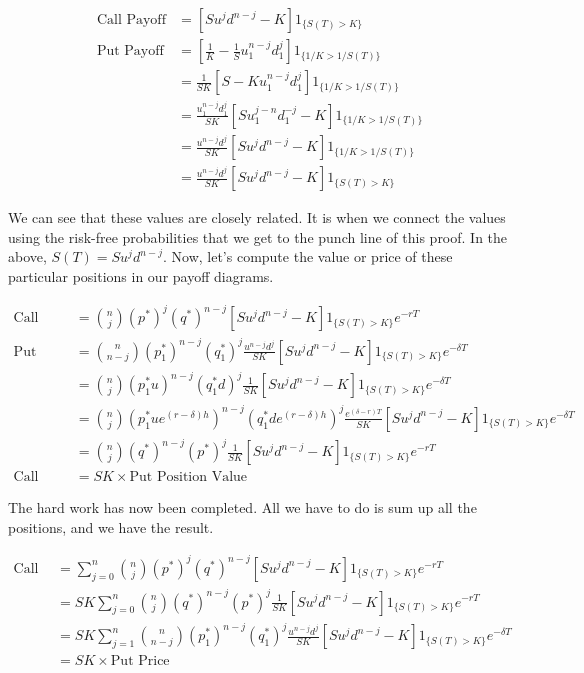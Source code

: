 \documentclass{ximera}
\begin{document}
\begin{align*}
\text{Call Payoff} 	&=[Su^jd^{n-j}-K]1_{\{S(T)>K\}}\\
\text{Put Payoff} 	&=\left[\frac{1}{K}-\frac{1}{S}u_1^{n-j}d_1^j\right]1_{\{1/K>1/S(T)\}}\\
			&=\frac{1}{SK}[S-Ku_1^{n-j}d_1^j]1_{\{1/K>1/S(T)\}}\\
			&=\frac{u_1^{n-j}d_1^j}{SK}[Su_1^{j-n}d_1^{-j}-K]1_{\{1/K>1/S(T)\}}\\
			&=\frac{u^{n-j}d^j}{SK}[Su^jd^{n-j}-K]1_{\{1/K>1/S(T)\}}\\
			&=\frac{u^{n-j}d^j}{SK}[Su^jd^{n-j}-K]1_{\{S(T)>K\}}
\end{align*}

We can see that these values are closely related. It is when we connect the values using the risk-free probabilities that we get to the punch line of this proof. In the above, $S(T)=Su^jd^{n-j}$. Now, let's compute the value or price of these particular positions in our payoff diagrams. 

\begin{align*}
\text{Call Position Value} 	&=\binom{n}{j}(p^*)^j(q^*)^{n-j}[Su^jd^{n-j}-K]1_{\{S(T)>K\}}e^{-rT}\\
\text{Put Position Value} 	&=\binom{n}{n-j}(p_1^*)^{n-j}(q_1^*)^{j}\frac{u^{n-j}d^j}{SK}[Su^jd^{n-j}-K]1_{\{S(T)>K\}}e^{-\delta T}\\
				&=\binom{n}{j}(p_1^*u)^{n-j}(q_1^*d)^{j}\frac{1}{SK}[Su^jd^{n-j}-K]1_{\{S(T)>K\}}e^{-\delta T}\\
				&=\binom{n}{j}(p_1^*ue^{(r-\delta)h})^{n-j}(q_1^*de^{(r-\delta)h})^j\frac{e^{(\delta-r)T}}{SK}[Su^jd^{n-j}-K]1_{\{S(T)>K\}}e^{-\delta T}\\
				&=\binom{n}{j}(q^*)^{n-j}(p^*)^j\frac{1}{SK}[Su^jd^{n-j}-K]1_{\{S(T)>K\}}e^{-rT}\\
\text{Call Position Value} 	&=SK\times\text{Put Position Value}
\end{align*}

The hard work has now been completed. All we have to do is sum up all the positions, and we have the result.

\begin{align*}
\text{Call Price} 	&=\sum_{j=0}^n\binom{n}{j}(p^*)^j(q^*)^{n-j}[Su^jd^{n-j}-K]1_{\{S(T)>K\}}e^{-rT}\\
			&=SK\sum_{j=0}^n\binom{n}{j}(q^*)^{n-j}(p^*)^j\frac{1}{SK}[Su^jd^{n-j}-K]1_{\{S(T)>K\}}e^{-rT}\\
			&=SK\sum_{j=1}^n\binom{n}{n-j}(p_1^*)^{n-j}(q_1^*)^{j}\frac{u^{n-j}d^j}{SK}[Su^jd^{n-j}-K]1_{\{S(T)>K\}}e^{-\delta T}\\
			&=SK\times \text{Put Price}
\end{align*}
\end{document}
